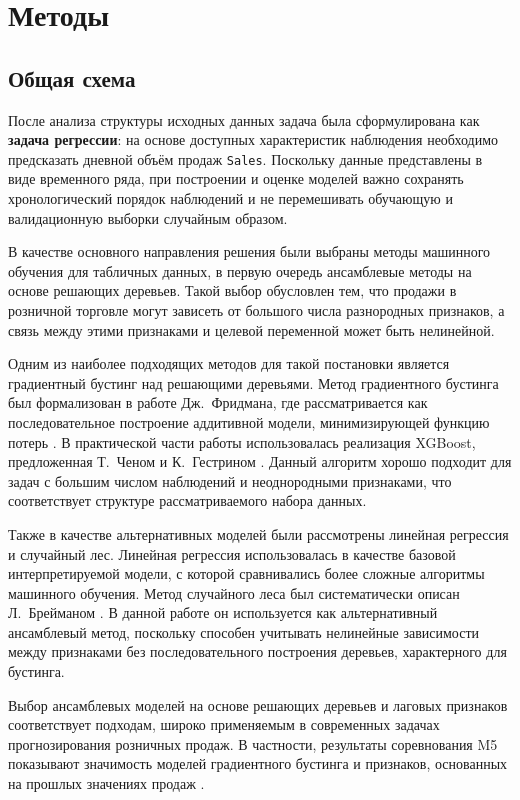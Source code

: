 \documentclass[12pt,a4paper]{article}
\numberwithin{equation}{section}
\begin{document}
\section{Методы}

\subsection{Общая схема}

После анализа структуры исходных данных задача была сформулирована как \textbf{задача регрессии}: на основе доступных характеристик наблюдения необходимо предсказать дневной объём продаж \texttt{Sales}. Поскольку данные представлены в виде временного ряда, при построении и оценке моделей важно сохранять хронологический порядок наблюдений и не перемешивать обучающую и валидационную выборки случайным образом.

В качестве основного направления решения были выбраны методы машинного обучения для табличных данных, в первую очередь ансамблевые методы на основе решающих деревьев. Такой выбор обусловлен тем, что продажи в розничной торговле могут зависеть от большого числа разнородных признаков, а связь между этими признаками и целевой переменной может быть нелинейной.

Одним из наиболее подходящих методов для такой постановки является градиентный бустинг над решающими деревьями. Метод градиентного бустинга был формализован в работе Дж.~Фридмана, где рассматривается как последовательное построение аддитивной модели, минимизирующей функцию потерь \cite{friedman2001greedy}. В практической части работы использовалась реализация XGBoost, предложенная Т.~Ченом и К.~Гестрином \cite{chen2016xgboost}. Данный алгоритм хорошо подходит для задач с большим числом наблюдений и неоднородными признаками, что соответствует структуре рассматриваемого набора данных.

Также в качестве альтернативных моделей были рассмотрены линейная регрессия и случайный лес. Линейная регрессия использовалась в качестве базовой интерпретируемой модели, с которой сравнивались более сложные алгоритмы машинного обучения. Метод случайного леса был систематически описан Л.~Брейманом \cite{breiman2001random}. В данной работе он используется как альтернативный ансамблевый метод, поскольку способен учитывать нелинейные зависимости между признаками без последовательного построения деревьев, характерного для бустинга.

Выбор ансамблевых моделей на основе решающих деревьев и лаговых признаков соответствует подходам, широко применяемым в современных задачах прогнозирования розничных продаж. В частности, результаты соревнования M5 показывают значимость моделей градиентного бустинга и признаков, основанных на прошлых значениях продаж \cite{makridakis2022m5}.
\end{document}
